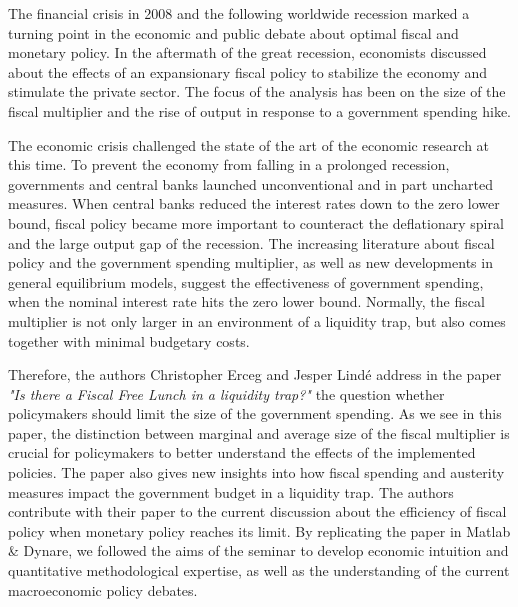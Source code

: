\documentclass[12pt,a4paper,oneside,titlepage]{article}
\begin{document}
The financial crisis in 2008 and the following worldwide recession marked a turning point in the economic and public debate about optimal fiscal and monetary policy. In the aftermath of the great recession, economists discussed about the effects of an expansionary fiscal policy to stabilize the economy and stimulate the private sector. The focus of the analysis has been on the size of the fiscal multiplier and the rise of output in response to a government spending hike.
\par
\bigskip
The economic crisis challenged the state of the art of the economic research at this time. To prevent the economy from falling in a prolonged recession, governments and central banks launched unconventional and in part uncharted measures. When central banks reduced the interest rates down to the zero lower bound, fiscal policy became more important to counteract the deflationary spiral and the large output gap of the recession. The increasing literature about fiscal policy and the government spending multiplier, as well as new developments in general equilibrium models, suggest the effectiveness of government spending, when the nominal interest rate hits the zero lower bound. Normally, the fiscal multiplier is not only larger in an environment of a liquidity trap, but also comes together with minimal budgetary costs.
\par
\bigskip
Therefore, the authors Christopher Erceg and Jesper Lindé address in the paper \textit{"Is there a Fiscal Free Lunch in a liquidity trap?"} the question whether policymakers should limit the size of the government spending. As we see in this paper, the distinction between marginal and average size of the fiscal multiplier is crucial for policymakers to better understand the effects of the implemented policies. The paper also gives new insights into how fiscal spending and austerity measures impact the government budget in a liquidity trap. The authors contribute with their paper to the current discussion about the efficiency of fiscal policy when monetary policy reaches its limit. By replicating the paper in Matlab \& Dynare, we followed the aims of the seminar to develop economic intuition and quantitative
methodological expertise, as well as the understanding of the current macroeconomic policy debates.
\par
\bigskip
\end{document}
